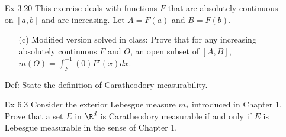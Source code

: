 \documentclass[letterpaper]{article}
\begin{document}
\begin{enumerate}
	\pagebreak
	\item[Ex 3.20] This exercise deals with functions $F$ that are absolutely continuous on $[a,b]$ and are increasing.  Let $A = F(a)$ and $B=F(b)$.
	\begin{enumerate}[label=(\alph*)]
		\item[(c)] Modified version solved in class: Prove that for any increasing absolutely continuous $F$ and $O$, an open subset of $[A,B]$, $m(O) = \int_F^{-1}(0) F'(x) dx$. 
	\end{enumerate}
	
	\pagebreak
	\item[Def:]	State the definition of Caratheodory measurability. 
	\vspace{1.5in}
	
	\item[Ex 6.3] Consider the exterior Lebesgue measure $m_*$ introduced in Chapter 1.  Prove that a set $E$ in $\R^d$ is Caratheodory measurable if and only if $E$ is Lebesgue measurable in the sense of Chapter 1. 
    
	
	
\end{enumerate}
\end{document}
